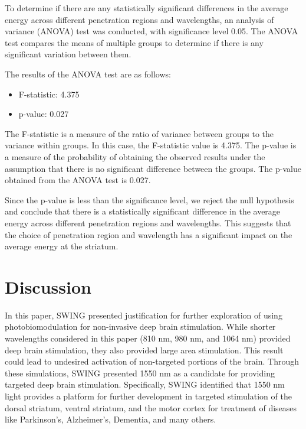 \documentclass[journal,twoside,web]{ieeecolor}
\begin{document}
To determine if there are any statistically significant differences in the average energy across different penetration regions and wavelengths, an analysis of variance (ANOVA) test was conducted, with significance level 0.05. The ANOVA test compares the means of multiple groups to determine if there is any significant variation between them.

The results of the ANOVA test are as follows:

\begin{itemize}
    \item F-statistic: 4.375
    \item p-value: 0.027
\end{itemize}

The F-statistic is a measure of the ratio of variance between groups to the variance within groups. In this case, the F-statistic value is 4.375. The p-value is a measure of the probability of obtaining the observed results under the assumption that there is no significant difference between the groups. The p-value obtained from the ANOVA test is 0.027.

Since the p-value is less than the significance level, we reject the null hypothesis and conclude that there is a statistically significant difference in the average energy across different penetration regions and wavelengths. This suggests that the choice of penetration region and wavelength has a significant impact on the average energy at the striatum.






\section{Discussion}
\label{sec:next steps}
In this paper, SWING presented justification for further exploration of using photobiomodulation for non-invasive deep brain stimulation. While 
shorter wavelengths considered in this paper (810 nm, 980 nm, and 1064 nm) provided deep brain stimulation, they also provided large area stimulation. 
This result could lead to undesired activation of non-targeted portions of the brain. Through these simulations, SWING presented 1550 nm as a candidate for 
providing targeted deep brain stimulation. Specifically, SWING identified that 1550 nm light provides a platform for further development in targeted 
stimulation of the dorsal striatum, ventral striatum, and the motor cortex for treatment of diseases like Parkinson's, Alzheimer's, Dementia, and many others.
\end{document}
